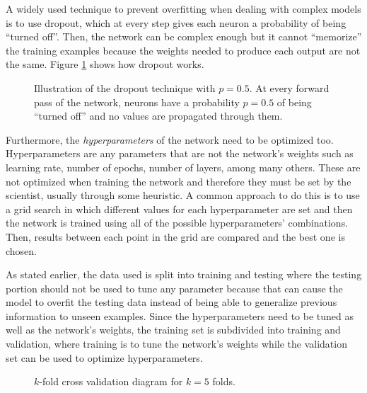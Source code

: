 A widely used technique to prevent overfitting when dealing with complex models is to use dropout, which at every step gives each neuron a probability of being “turned off”. Then, the network can be complex enough but it cannot “memorize” the training examples because the weights needed to produce each output are not the same. Figure \ref{fig:dropout} shows how dropout works.

\begin{figure}
    \centering
    \resizebox{\linewidth}{!}{
    
    }
    \caption[Illustration of the dropout technique with $p=0.5$]{Illustration of the dropout technique with $p=0.5$. At every forward pass of the network, neurons have a probability $p=0.5$ of being “turned off” and no values are propagated through them.}
   \label{fig:dropout}
\end{figure}

Furthermore, the \textit{hyperparameters} of the network need to be optimized too. Hyperparameters are any parameters that are not the network's weights such as learning rate, number of epochs, number of layers, among many others. These are not optimized when training the network and therefore they must be set by the scientist, usually through some heuristic. A common approach to do this is to use a grid search in which different values for each hyperparameter are set and then the network is trained using all of the possible hyperparameters' combinations. Then, results between each point in the grid are compared and the best one is chosen.

As stated earlier, the data used is split into training and testing where the testing portion should not be used to tune any parameter because that can cause the model to overfit the testing data instead of being able to generalize previous information to unseen examples. Since the hyperparameters need to be tuned as well as the network's weights, the training set is subdivided into training and validation, where training is to tune the network's weights while the validation set can be used to optimize hyperparameters.

\begin{figure}
    \centering
        \caption[$k$-fold cross validation diagram]{$k$-fold cross validation diagram for $k=5$ folds.}
    \label{fig:kfold}
\end{figure}


